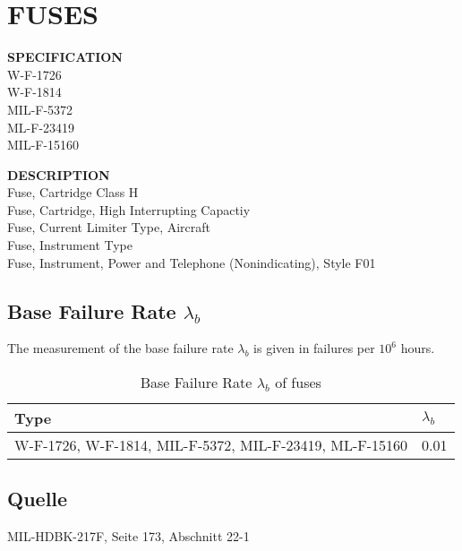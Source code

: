 \section{FUSES}

\begin{minipage}[t]{0.24\textwidth}
    \textbf{SPECIFICATION}\\
    W-F-1726\\W-F-1814\\MIL-F-5372\\ML-F-23419\\MIL-F-15160
\end{minipage}
\hfill
\begin{minipage}[t]{0.75\textwidth}
    \textbf{DESCRIPTION}\\
    Fuse, Cartridge Class H\\
    Fuse, Cartridge, High Interrupting Capactiy\\
    Fuse, Current Limiter Type, Aircraft \\
    Fuse, Instrument Type \\
    Fuse, Instrument, Power and Telephone (Nonindicating), Style F01
\end{minipage}

\subsection{Base Failure Rate $\lambda_b$}
The measurement of the base failure rate $\lambda_b$ is given in failures per $10^6$ hours.
\begin{table}[ht]
{\centering

\begin{tabular}{|p{5.5cm}|p{5cm}|}
    \hline
    \textbf{Type} & \textbf{$\lambda_b$} \\
    \hline
    W-F-1726, W-F-1814, MIL-F-5372, MIL-F-23419, ML-F-15160 & 0.01 \\
    \hline
\end{tabular}

\caption{Base Failure Rate $\lambda_b$ of fuses}

\label{tab:bfr_fuses}
\par}
\end{table}
\subsection*{Quelle}
MIL-HDBK-217F, Seite 173, Abschnitt 22-1